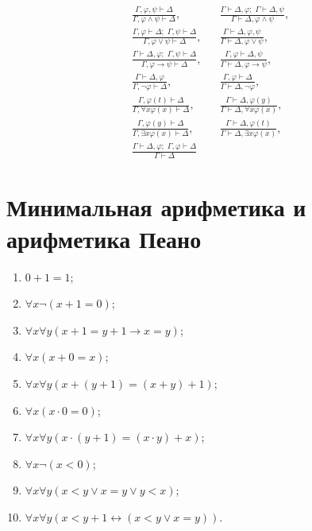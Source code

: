 \documentclass[a4paper,11pt]{article}
\begin{document}
\begin{align*}
&\frac{\Gamma,\varphi,\psi\vdash\Delta}{\Gamma,\varphi\land\psi\vdash\Delta},&&
\frac{\Gamma\vdash\Delta,\varphi;\;\Gamma\vdash\Delta,\psi}{\Gamma\vdash\Delta,\varphi\land\psi},
\\[0.3cm]
&\frac{\Gamma,\varphi\vdash\Delta;\;\Gamma,\psi\vdash\Delta}{\Gamma,\varphi\lor\psi\vdash\Delta},&&
\frac{\Gamma\vdash\Delta,\varphi,\psi}{\Gamma\vdash\Delta,\varphi\lor\psi},
\\[0.3cm]
&\frac{\Gamma\vdash\Delta,\varphi;\;\Gamma,\psi\vdash\Delta}{\Gamma,\varphi\rightarrow\psi\vdash\Delta},&&
\frac{\Gamma,\varphi\vdash\Delta,\psi}{\Gamma\vdash\Delta,\varphi\rightarrow\psi},
\\[0.3cm]
&\frac{\Gamma\vdash\Delta,\varphi}{\Gamma,\neg\varphi\vdash\Delta},&&
\frac{\Gamma,\varphi\vdash\Delta}{\Gamma\vdash\Delta,\neg\varphi},
\\[0.3cm]
&\frac{\Gamma,\varphi(t)\vdash\Delta}{\Gamma,\forall x\varphi(x)\vdash\Delta}, &&
\frac{\Gamma\vdash\Delta,\varphi(y)}{\Gamma\vdash\Delta,\forall x\varphi(x)},
\\[0.3cm]
&\frac{\Gamma,\varphi(y)\vdash\Delta}{\Gamma,\exists x\varphi(x)\vdash\Delta}, &&
\frac{\Gamma\vdash\Delta,\varphi(t)}{\Gamma\vdash\Delta,\exists x\varphi(x)},
\\[0.6cm]
&\frac{\Gamma\vdash\Delta,\varphi;\;\Gamma,\varphi\vdash\Delta}{\Gamma\vdash\Delta}
\end{align*}

\newpage
\section{Минимальная арифметика и арифметика Пеано}

\begin{enumerate}
	\item $0 + 1 = 1$;

	\item $\forall x \neg(x + 1 = 0)$;

	\item $\forall x \forall y (x + 1 = y +1 \rightarrow x = y)$; 

	\item $\forall x (x+0 = x)$;

	\item $\forall x \forall y (x + (y + 1)= (x + y) + 1)$; 

	\item $\forall x (x\cdot 0 = 0)$;

	\item $\forall x \forall y (x\cdot (y + 1)= (x \cdot y) + x)$;  

	\item $\forall x \neg (x <0)$;

	\item $\forall x \forall y (x < y \vee x = y \vee y < x)$;  

	\item  $\forall x\forall y (x < y + 1 \leftrightarrow (x < y \vee x = y))$.
\end{enumerate}
\end{document}
